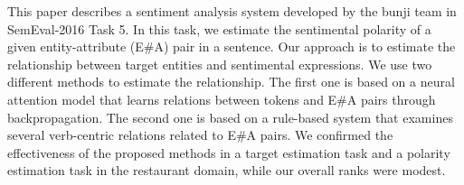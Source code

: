 This paper describes a sentiment analysis system developed by the bunji team in SemEval-2016 Task 5. In this task, we estimate the sentimental polarity of a given entity-attribute (E\#A) pair in a sentence. Our approach is to estimate the relationship between target entities and sentimental expressions. We use two different methods to estimate the relationship. The first one is based on a neural attention model that learns relations between tokens and E\#A pairs through backpropagation. The second one is based on a rule-based system that examines several verb-centric relations related to E\#A pairs. We confirmed the effectiveness of the proposed methods in a target estimation task and a polarity estimation task in the restaurant domain, while our overall ranks were modest.

